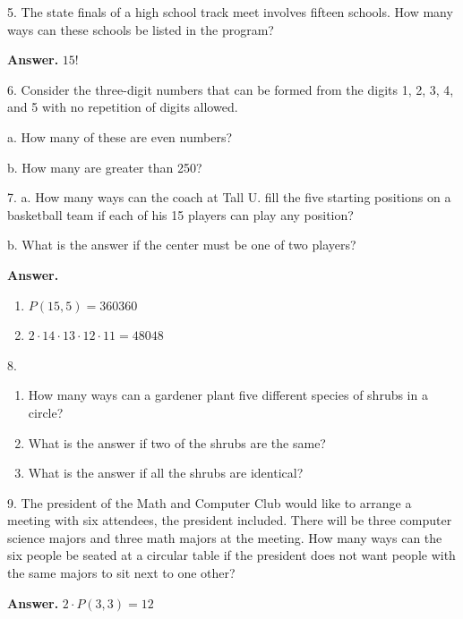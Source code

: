 \documentclass[10pt,]{book}
\theoremstyle{plain}
\theoremstyle{definition}
\theoremstyle{definition}
\theoremstyle{definition}
\begin{document}
\begin{exercisegroup}
\begin{enumerate}[label=\alph*]
\end{enumerate}
%
\par\smallskip
\item[5.]\hypertarget{exercise-25}{} The state finals of a high school track meet involves fifteen schools. How many ways can these schools be listed in the program?%
\par\smallskip
\par\smallskip
\noindent\textbf{Answer.}\hypertarget{answer-13}{}\quad
 \(15!\)%
\item[6.]\hypertarget{exercise-26}{} Consider the three-digit numbers that can be formed from the digits 1, 2, 3, 4, and 5 with no repetition of digits allowed.%
\par
a. How many of these are even numbers?%
\par
b. How many are greater than 250?%
\par\smallskip
\item[7.]\hypertarget{exercise-27}{}a. How many ways can the coach at Tall U. fill the five starting positions on a basketball team if each of his 15 players can play any position?%
\par
b. What is the answer if the center must be one of two players?%
\par\smallskip
\par\smallskip
\noindent\textbf{Answer.}\hypertarget{answer-14}{}\quad
\leavevmode%
\begin{enumerate}[label=\alph*]
\item\hypertarget{li-28}{} \(P(15,5)=360360\)%
\item\hypertarget{li-29}{} \(2\cdot 14\cdot 13\cdot 12\cdot 11=48048\)%
\end{enumerate}
%
\item[8.]\hypertarget{exercise-28}{}\leavevmode%
\begin{enumerate}[label=\alph*]
\item\hypertarget{li-30}{}How many ways can a gardener plant five different species of shrubs in a circle?%
\item\hypertarget{li-31}{}What is the answer if two of the shrubs are the same?%
\item\hypertarget{li-32}{}What is the answer if all the shrubs are identical?%
\end{enumerate}
%
\par\smallskip
\item[9.]\hypertarget{exercise-29}{} The president of the Math and Computer Club would like to arrange a meeting with six attendees, the president included. There will be three computer science majors and three math majors at the meeting. How many ways can the six people be seated at a circular table if the president does not want people with the same majors to sit next to one other?%
\par\smallskip
\par\smallskip
\noindent\textbf{Answer.}\hypertarget{answer-15}{}\quad
 \(2\cdot P(3,3)=12\)%
\end{exercisegroup}
\end{document}
